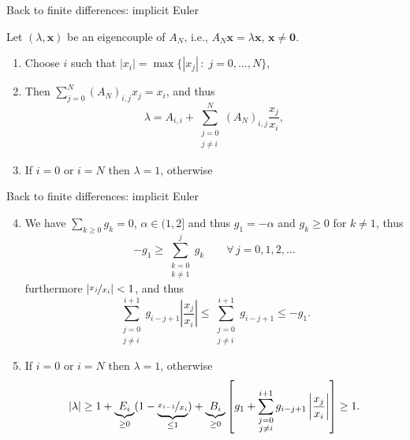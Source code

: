 \documentclass[aspectratio=169,xcolor=dvipsnames]{beamer}
\begin{document}
\begin{frame}{Back to finite differences: implicit Euler}

Let $(\lambda,\mathbf{x})$ be an eigencouple of $A_N$, i.e., $A_N \mathbf{x} = \lambda \mathbf{x}$, $\mathbf{x} \neq \mathbf{0}$.
\begin{enumerate}
	\item<2-> Choose $i$ such that $|x_i| = \max\{ |x_j| \,:\; j=0,\ldots,N \}$,
	\item<3-> Then $\displaystyle \sum_{j=0}^{N} (A_N)_{i,j} x_j = x_i$, and thus
	\[
	\lambda = A_{i,i} + \sum_{\substack{j=0\\j\neq i}}^N (A_N)_{i,j} \frac{x_j}{x_i},
	\] 
	\item<4-> If $i = 0$ or $i = N$ then $\lambda = 1$, otherwise
	\only<4>{\[
	\lambda = 1 + E_i - g_1 B_1 - g_0 B_i \frac{x_{i+1}}{x_i}  (E_i + g_2 B_i) \frac{x_{i-1}}{x_i} - B_i \sum_{j=0}^{i-2} h_{i-j+1} \frac{x_j}{x_i}
	\]}
	\only<5>{
	\[
	\lambda = 1 + E_i(1 - \nicefrac{x_{i-1}}{x_i}) - B_i \left[ g_1 + \sum_{\substack{j=0\\j\neq i}}^{i+1} g_{i-j+1} \frac{x_j}{x_i} \right]
	\]
	}
\end{enumerate}

\end{frame}

\begin{frame}{Back to finite differences: implicit Euler}
	\begin{enumerate}
	\setcounter{enumi}{3}
	\item We have $\sum_{k \geq 0} g_k = 0$, $\alpha \in (1,2]$ and thus $g_1 = -\alpha$ and $g_k \geq 0$ for $k \neq 1$, thus
	\[
	-g_1 \geq \sum_{\substack{k=0\\k\neq 1}}^j g_k \qquad \forall\,j=0,1,2,\ldots
	\]
	furthermore $|\nicefrac{x_j}{x_i}| < 1$, and thus
	\[
	\sum_{\substack{j=0\\j\neq i}}^{i+1} g_{i-j+1} \left|\frac{x_j}{x_i}\right| \leq \sum_{\substack{j=0\\j\neq i}}^{i+1} g_{i-j+1} \leq - g_1.
	\]
	\setcounter{enumi}{2}
	\item<2-> If $i = 0$ or $i = N$ then $\lambda = 1$, otherwise
	\[
		|\lambda| \geq 1 + \underbrace{E_i}_{\geq 0}(1 - \underbrace{\nicefrac{x_{i-1}}{x_i}}_{\leq 1}) + \underbrace{B_i}_{\geq 0} \left[ g_1 + \sum_{\substack{j=0\\j\neq i}}^{i+1} g_{i-j+1} \left|\frac{x_j}{x_i}\right| \right] \geq 1.
	\]
	\end{enumerate}

\end{frame}
\end{document}
